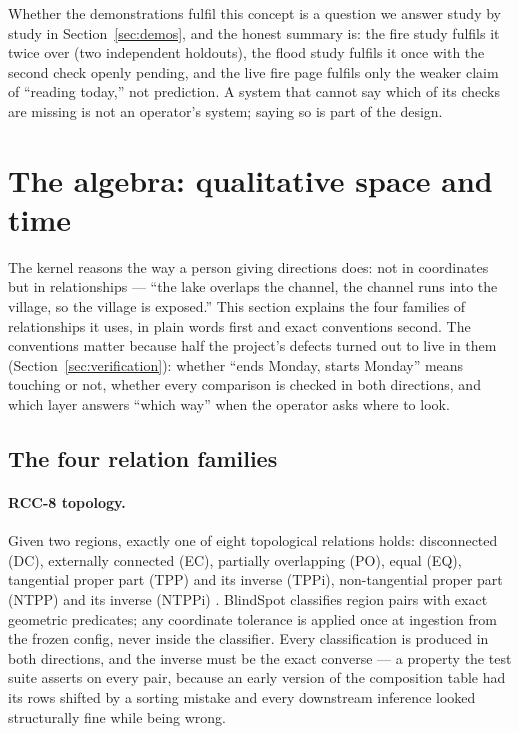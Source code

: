 \documentclass[11pt]{article}
\begin{document}
Whether the demonstrations fulfil this concept is a question we answer study
by study in Section~\ref{sec:demos}, and the honest summary is: the fire
study fulfils it twice over (two independent holdouts), the flood study
fulfils it once with the second check openly pending, and the live fire page
fulfils only the weaker claim of ``reading today,'' not prediction. A system
that cannot say which of its checks are missing is not an operator's system;
saying so is part of the design.

\section{The algebra: qualitative space and time}
\label{sec:algebra}

The kernel reasons the way a person giving directions does: not in
coordinates but in relationships --- ``the lake overlaps the channel, the
channel runs into the village, so the village is exposed.'' This section
explains the four families of relationships it uses, in plain words first and
exact conventions second. The conventions matter because half the project's
defects turned out to live in them (Section~\ref{sec:verification}): whether
``ends Monday, starts Monday'' means touching or not, whether every
comparison is checked in both directions, and which layer answers ``which
way'' when the operator asks where to look.

\subsection{The four relation families}

\paragraph{RCC-8 topology.} Given two regions, exactly one of eight
topological relations holds: disconnected (DC), externally connected (EC),
partially overlapping (PO), equal (EQ), tangential proper part (TPP) and its
inverse (TPPi), non-tangential proper part (NTPP) and its inverse (NTPPi)
\cite{randell1992}. BlindSpot classifies region pairs with exact geometric
predicates; any coordinate tolerance is applied once at ingestion from the
frozen config, never inside the classifier. Every classification is produced
in both directions, and the inverse must be the exact converse --- a property
the test suite asserts on every pair, because an early version of the
composition table had its rows shifted by a sorting mistake and every
downstream inference looked structurally fine while being wrong.
\end{document}
